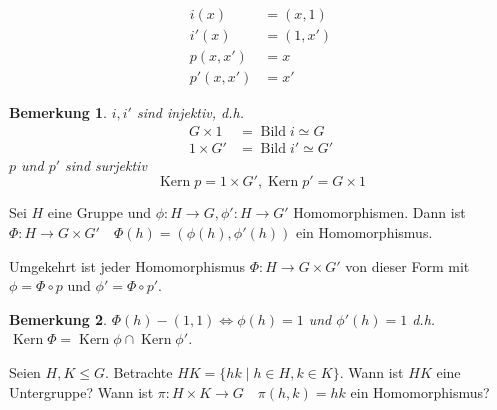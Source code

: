 \documentclass{article}
\theoremstyle{plain}
\newtheorem{bemerkung}{Bemerkung}
\renewcommand{\ker}{\mathop{\mathrm{Kern}}}
\newcommand{\bild}{\mathop{\mathrm{Bild}}}
\newcommand{\ug}{\leq}
\newcommand{\iso}{\simeq}
\begin{document}
\begin{align*}
    i(x) &= (x,1)\\
    i'(x)&=(1,x')\\
    p(x,x')&=x\\
    p'(x,x')&=x'
\end{align*}
\begin{bemerkung}
    $i,i'$ sind injektiv, d.h. \begin{align*}
        G\times 1&=\bild i \iso G\\
        1\times G'&=\bild i'\iso G'
    \end{align*}
    $p$ und $p'$ sind surjektiv $$\ker p=1\times G', \ker p'=G\times 1$$ 
\end{bemerkung}

Sei $H$ eine Gruppe und $\phi\colon H\to G, \phi'\colon H\to G'$ Homomorphismen.
Dann ist $\Phi\colon H\to G\times G'\quad \Phi(h)=(\phi(h),\phi'(h))$ ein Homomorphismus.

Umgekehrt ist jeder Homomorphismus $\Phi\colon H\to G\times G'$ von dieser Form mit $\phi=\Phi\circ p$ und $\phi'=\Phi\circ p'$.
\begin{bemerkung}
    $\Phi(h)-(1,1) \Leftrightarrow \phi(h)=1$ und $\phi'(h)=1$ d.h. $\ker \Phi =\ker\phi\cap\ker\phi'$.
\end{bemerkung}
Seien $H,K\ug G$. Betrachte $HK=\{hk\mid h\in H, k\in K\}$. Wann ist $HK$ eine Untergruppe?
Wann ist $\pi\colon H\times K \to G \quad \pi(h,k)=hk$ ein Homomorphismus?
\end{document}
